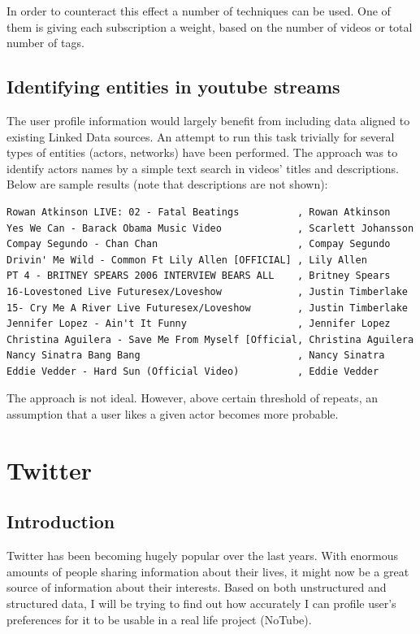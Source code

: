 \documentclass{article}
\begin{document}
In order to counteract this effect a number of techniques can be used. One of
them is giving each subscription a weight, based on the number of videos or
total number of tags.

\subsection{Identifying entities in youtube streams}
The user profile information would largely benefit from including data aligned
to existing Linked Data sources. An attempt to run this task trivially for
several types of entities (actors, networks) have been performed. The approach
was to identify actors names by a simple text search in videos' titles and
descriptions. Below are sample results (note that descriptions are not shown):

\begin{verbatim}
Rowan Atkinson LIVE: 02 - Fatal Beatings          , Rowan Atkinson
Yes We Can - Barack Obama Music Video             , Scarlett Johansson
Compay Segundo - Chan Chan                        , Compay Segundo
Drivin' Me Wild - Common Ft Lily Allen [OFFICIAL] , Lily Allen
PT 4 - BRITNEY SPEARS 2006 INTERVIEW BEARS ALL    , Britney Spears
16-Lovestoned Live Futuresex/Loveshow             , Justin Timberlake
15- Cry Me A River Live Futuresex/Loveshow        , Justin Timberlake
Jennifer Lopez - Ain't It Funny                   , Jennifer Lopez
Christina Aguilera - Save Me From Myself [Official, Christina Aguilera
Nancy Sinatra Bang Bang                           , Nancy Sinatra
Eddie Vedder - Hard Sun (Official Video)          , Eddie Vedder
\end{verbatim}

The approach is not ideal. However, above certain threshold of repeats, an
assumption that a user likes a given actor becomes more probable.


\newpage
\section{Twitter}

\subsection{Introduction}
Twitter has been becoming hugely popular over the last years. With enormous amounts of people sharing information about their lives, it might now be a great source of information about their interests. Based on both unstructured and structured data, I will be trying to find out how accurately I can profile user's preferences for it to be usable in a real life project (NoTube).
\end{document}
